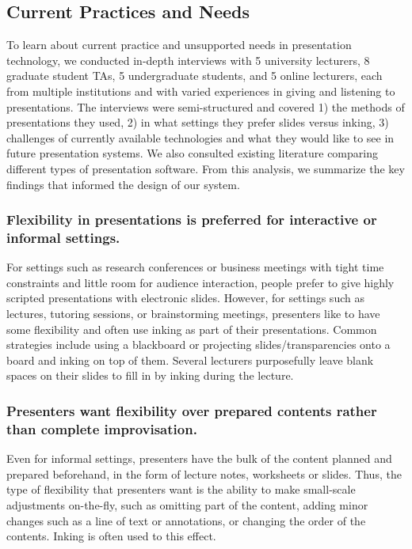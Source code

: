 \subsection{Current Practices and Needs}
To learn about current practice and unsupported needs in presentation technology, we conducted in-depth interviews with 5 university lecturers, 8 graduate student TAs, 5 undergraduate students, and 5 online lecturers, each from multiple institutions and with varied experiences in giving and listening to presentations. The interviews were semi-structured and covered 1) the methods of presentations they used, 2) in what settings they prefer slides versus inking, 3) challenges of currently available technologies and what they would like to see in future presentation systems. We also consulted existing literature comparing different types of presentation software. From this analysis, we summarize the key findings that informed the design of our system.

\subsubsection{Flexibility in presentations is preferred for interactive or informal settings.} For settings such as research conferences or business meetings with tight time constraints and little room for audience interaction, people prefer to give highly scripted presentations with electronic slides. However, for settings such as lectures, tutoring sessions, or brainstorming meetings, presenters like to have some flexibility and often use inking as part of their presentations. Common strategies include using a blackboard or projecting slides/transparencies onto a board and inking on top of them. Several lecturers purposefully leave blank spaces on their slides to fill in by inking during the lecture. 

\subsubsection{Presenters want flexibility over prepared contents rather than complete improvisation.} 
Even for informal settings, presenters have the bulk of the content planned and prepared beforehand, in the form of lecture notes, worksheets or slides. Thus, the type of flexibility that presenters want is the ability to make small-scale adjustments on-the-fly, such as omitting part of the content, adding minor changes such as a line of text or annotations, or changing the order of the contents. Inking is often used to this effect. 

